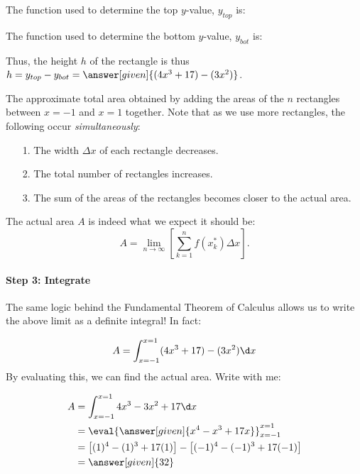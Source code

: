 \documentclass{ximera}
\begin{document}
\begin{question}
The function used to determine the top $y$-value, $y_{top}$ is:
\begin{multipleChoice}
\end{multipleChoice}
\end{question}

\begin{question}
The function used to determine the bottom $y$-value, $y_{bot}$ is:
\begin{multipleChoice}
\end{multipleChoice}
\end{question}

Thus, the height $h$ of the rectangle is thus $h=y_{top}-y_{bot} = \answer[given]{(4x^3+17)-(3x^2)}$.

The approximate total area obtained by adding the areas of the $n$ rectangles between $x=-1$ and $x=1$ together.  Note that as we use more rectangles, the following occur \emph{simultaneously}:

\begin{itemize}
\item[1.] The width $\Delta x$ of each rectangle decreases.
\item[2.] The total number of rectangles increases.
\item[3.] The sum of the areas of the rectangles becomes closer to the actual area.
\end{itemize}

The actual area $A$ is indeed what we expect it should be: $$A = \lim_{n \rightarrow \infty} \left[ \sum_{k=1}^n f(x_k^*) \Delta x \right].$$ 


\paragraph{Step 3: Integrate}

The same logic behind the Fundamental Theorem of Calculus allows us to write the above limit as a definite integral!  In fact:

\[
A = \int_{x=-1}^{x=1} (4x^3+17)-(3x^2) \d x
\]
By evaluating this, we can find the actual area.  Write with me:

\begin{align*}
A &= \int_{x=-1}^{x=1} 4x^3-3x^2+17 \d x \\
&= \eval{ \answer[given]{x^4-x^3+17x}}_{x= -1}^{x=1} \\
&= \left[(1)^4-(1)^3+17(1)\right] -  \left[(-1)^4-(-1)^3+17(-1)\right] \\
&=\answer[given]{32}
\end{align*}
\end{document}
